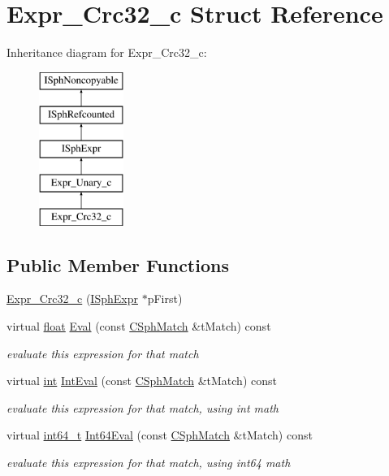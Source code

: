 \hypertarget{structExpr__Crc32__c}{\section{Expr\-\_\-\-Crc32\-\_\-c Struct Reference}
\label{structExpr__Crc32__c}
}
Inheritance diagram for Expr\-\_\-\-Crc32\-\_\-c\-:\begin{figure}[H]
\begin{center}
\leavevmode
\includegraphics[height=5.000000cm]{structExpr__Crc32__c}
\end{center}
\end{figure}
\subsection*{Public Member Functions}
\begin{DoxyCompactItemize}
\item 
\hyperlink{structExpr__Crc32__c_adc77d6f0f8e6bfb0955b29664e168e15}{Expr\-\_\-\-Crc32\-\_\-c} (\hyperlink{structISphExpr}{I\-Sph\-Expr} $\ast$p\-First)
\item 
virtual \hyperlink{sphinxexpr_8cpp_a0e0d0739f7035f18f949c2db2c6759ec}{float} \hyperlink{structExpr__Crc32__c_a242db845ab8eb7e3a2b72c98e00a7919}{Eval} (const \hyperlink{classCSphMatch}{C\-Sph\-Match} \&t\-Match) const 
\begin{DoxyCompactList}\small\item\em evaluate this expression for that match \end{DoxyCompactList}\item 
virtual \hyperlink{sphinxexpr_8cpp_a4a26e8f9cb8b736e0c4cbf4d16de985e}{int} \hyperlink{structExpr__Crc32__c_a937d72abda1316690af91d287f5ecfe6}{Int\-Eval} (const \hyperlink{classCSphMatch}{C\-Sph\-Match} \&t\-Match) const 
\begin{DoxyCompactList}\small\item\em evaluate this expression for that match, using int math \end{DoxyCompactList}\item 
virtual \hyperlink{sphinxstd_8h_a996e72f71b11a5bb8b3b7b6936b1516d}{int64\-\_\-t} \hyperlink{structExpr__Crc32__c_a8bd8d20ea1a687ecba9874c7915b82e4}{Int64\-Eval} (const \hyperlink{classCSphMatch}{C\-Sph\-Match} \&t\-Match) const 
\begin{DoxyCompactList}\small\item\em evaluate this expression for that match, using int64 math \end{DoxyCompactList}\end{DoxyCompactItemize}
